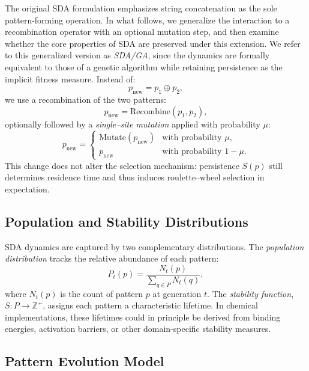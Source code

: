 \documentclass[life,article,submit,pdftex,moreauthors]{Definitions/mdpi}
\begin{document}
The original SDA formulation emphasizes string concatenation as the sole 
pattern-forming operation. In what follows, we generalize the interaction 
to a recombination operator with an optional mutation step, and then examine 
whether the core properties of SDA are preserved under this extension. 
We refer to this generalized version as \textit{SDA/GA}, since the dynamics 
are formally equivalent to those of a genetic algorithm while retaining 
persistence as the implicit fitness measure. Instead of:
\[
p_{\text{new}} = p_1 \oplus p_2,
\]
we use a recombination of the two patterns:
\[
p_{\text{new}} = \mathrm{Recombine}(p_1,p_2),
\]
optionally followed by a \emph{single–site mutation} applied with probability $\mu$:
\[
p_{\text{new}} =
\begin{cases}
\mathrm{Mutate}(p_{\text{new}}) & \text{with probability } \mu,\\
p_{\text{new}} & \text{with probability } 1-\mu.
\end{cases}
\]
This change does not alter the selection mechanism: persistence $S(p)$ still 
determines residence time and thus induces roulette–wheel selection in expectation.


\subsection{Population and Stability Distributions}

SDA dynamics are captured by two complementary distributions. 
The \textit{population distribution} tracks the relative abundance of each pattern:
\begin{equation}
P_t(p) = \frac{N_t(p)}{\sum_{q \in P} N_t(q)},
\end{equation}
where $N_t(p)$ is the count of pattern $p$ at generation $t$. 
The \textit{stability function}, $S: P \rightarrow \mathbb{Z}^+$, assigns each pattern a characteristic lifetime. 
In chemical implementations, these lifetimes could in principle be derived from binding energies, activation barriers, or other domain-specific stability measures.

\subsection{Pattern Evolution Model}
\end{document}
